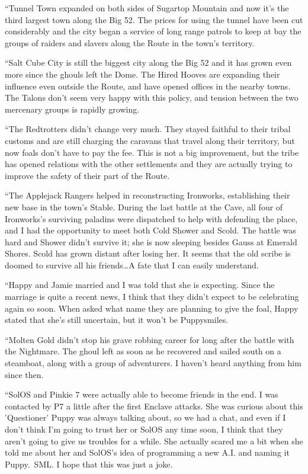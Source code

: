 {``Tunnel Town expanded on both sides of Sugartop Mountain and now it's the third largest town along the Big 52. The prices for using the tunnel have been cut considerably and the city began a service of long range patrols to keep at bay the groups of raiders and slavers along the Route in the town's territory.

``Salt Cube City is still the biggest city along the Big 52 and it has grown even more since the ghouls left the Dome. The Hired Hooves are expanding their influence even outside the Route, and have opened offices in the nearby towns. The Talons don't seem very happy with this policy, and tension between the two mercenary groups is rapidly growing.

``The Redtrotters didn't change very much. They stayed faithful to their tribal customs and are still charging the caravans that travel along their territory, but now foals don't have to pay the fee. This is not a big improvement, but the tribe has opened relations with the other settlements and they are actually trying to improve the safety of their part of the Route.

``The Applejack Rangers helped in reconstructing Ironworks, establishing their new base in the town's Stable. During the last battle at the Cave, all four of Ironworks's surviving paladins were dispatched to help with defending the place, and I had the opportunity to meet both Cold Shower and Scold. The battle was hard and Shower didn't survive it; she is now sleeping besides Gauss at Emerald Shores. Scold has grown distant after losing her. It seems that the old scribe is doomed to survive all his friends\dots A fate that I can easily understand.

``Happy and Jamie married and I was told that she is expecting. Since the marriage is quite a recent news, I think that they didn't expect to be celebrating again so soon. When asked what name they are planning to give the foal, Happy stated that she's still uncertain, but it won't be Puppysmiles.

``Molten Gold didn't stop his grave robbing career for long after the battle with the Nightmare. The ghoul left as soon as he recovered and sailed south on a steamboat, along with a group of adventurers. I haven't heard anything from him since then.

``SolOS and Pinkie 7 were actually able to become friends in the end. I was contacted by P7 a little after the first Enclave attacks. She was curious about this 'Questioner' Puppy was always talking about, so we had a chat, and even if I don't think I'm going to trust her or SolOS any time soon, I think that they aren't going to give us troubles for a while. She actually scared me a bit when she told me about her and SolOS's idea of programming a new A.I. and naming it Puppy.~SML. I hope that this was just a joke.

}
